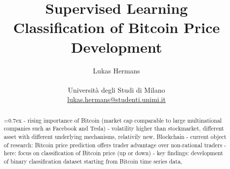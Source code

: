 \title{\large Supervised Learning \\ \LARGE
 Classification of Bitcoin Price Development}
\author{Lukas Hermans\\ \\
{Università degli Studi di Milano} \\
\href{mailto:lukas.hermans@studenti.unimi.it}
{lukas.hermans@studenti.unimi.it}}

\maketitle

\begin{abstract} 
\noindent
{}\font=0.7ex%
- rising importance of Bitcoin (market cap comparable to large multinational companies such as Facebook and Tesla)
- volatility higher than stockmarket, different asset with different underlying mechanisms, relativily new, Blockchain
- current object of research: Bitcoin price prediction offers trader advantage over non-rational traders
- here: focus on classification of Bitcoin price (up or down)
- key findings: development of binary classification dataset starting from Bitcoin time series data, 
\end{abstract}
